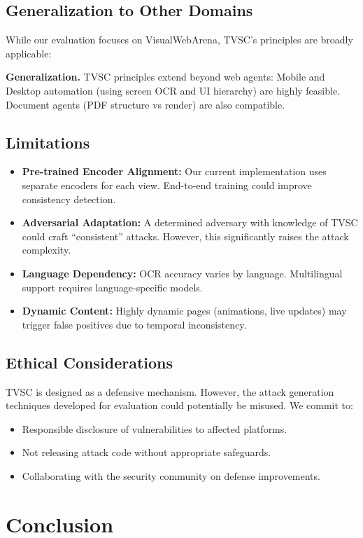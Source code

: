 \documentclass{llncs}
\begin{document}
\subsection{Generalization to Other Domains}
While our evaluation focuses on VisualWebArena, TVSC's principles are broadly applicable:

\textbf{Generalization.} TVSC principles extend beyond web agents: Mobile and Desktop automation (using screen OCR and UI hierarchy) are highly feasible. Document agents (PDF structure vs render) are also compatible.


\subsection{Limitations}
\begin{itemize}
    \item \textbf{Pre-trained Encoder Alignment:} Our current implementation uses separate encoders for each view. End-to-end training could improve consistency detection.
    \item \textbf{Adversarial Adaptation:} A determined adversary with knowledge of TVSC could craft ``consistent'' attacks. However, this significantly raises the attack complexity.
    \item \textbf{Language Dependency:} OCR accuracy varies by language. Multilingual support requires language-specific models.
    \item \textbf{Dynamic Content:} Highly dynamic pages (animations, live updates) may trigger false positives due to temporal inconsistency.
\end{itemize}

\subsection{Ethical Considerations}
TVSC is designed as a defensive mechanism. However, the attack generation techniques developed for evaluation could potentially be misused. We commit to:
\begin{itemize}
    \item Responsible disclosure of vulnerabilities to affected platforms.
    \item Not releasing attack code without appropriate safeguards.
    \item Collaborating with the security community on defense improvements.
\end{itemize}

\section{Conclusion}
\end{document}
